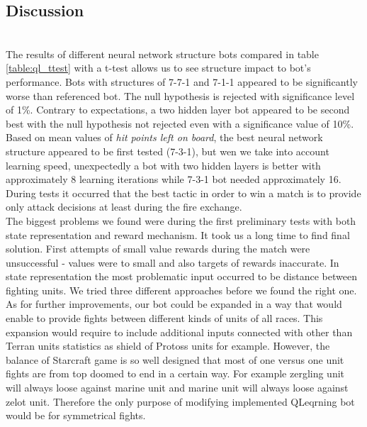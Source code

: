 \subsection{Discussion} \hfill \\ \hphantom{x}
The results of different neural network structure bots compared in table \ref{table:ql_ttest} with a t-test allows us to see structure impact to bot's performance. Bots with structures of 7-7-1 and 7-1-1 appeared to be significantly worse than referenced bot. The null hypothesis is rejected with significance level of 1\%. Contrary to expectations, a two hidden layer bot appeared to be second best with the null hypothesis not rejected even with a significance value of 10\%. Based on mean values of \emph{hit points left on board}, the best neural network structure appeared to be first tested (7-3-1), but wen we take into account learning speed, unexpectedly a bot with two hidden layers is better with approximately 8 learning iterations while 7-3-1 bot needed approximately 16. \\ \hphantom{x}
%
During tests it occurred that the best tactic in order to win a match is to provide only attack decisions at least during the fire exchange. \\ \hphantom{x}
%
The biggest problems we found were during the first preliminary tests with both state representation and reward mechanism. It took us a long time to find final solution. First attempts of small value rewards during the match were unsuccessful - values were to small and also targets of rewards inaccurate. In state representation the most problematic input occurred to be distance between fighting units. We tried three different approaches before we found the right one. \\ \hphantom{x}
%
As for further improvements, our bot could be expanded in a way that would enable to provide fights between different kinds of units of all races. This expansion would require to include additional inputs connected with other than Terran units statistics as shield of Protoss units for example. However, the balance of Starcraft game is so well designed that most of one versus one unit fights are from top doomed to end in a certain way. For example zergling unit will always loose against marine unit and marine unit will always loose against zelot unit. Therefore the only purpose of modifying implemented QLeqrning bot would be for symmetrical fights. \\ \hphantom{x}
